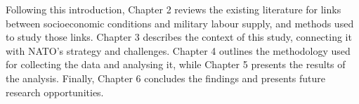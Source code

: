 Following this introduction, Chapter 2 reviews the existing literature for links between socioeconomic conditions and military labour supply, and methods used to study those links. 
Chapter 3 describes the context of this study, connecting it with NATO's strategy and challenges. Chapter 4 outlines the methodology used for collecting the data and analysing it, while Chapter 5 presents the results of the analysis.
Finally, Chapter 6 concludes the findings and presents future research opportunities.